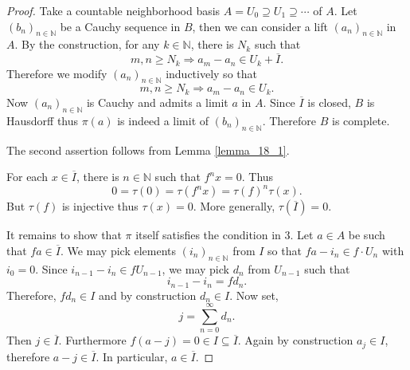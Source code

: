 \documentclass[10pt]{article}
\numberwithin{equation}{section}
\theoremstyle{definition}
\newcommand{\N}[0]{\mathbb{N}}
\begin{document}
\begin{proof}
    Take a countable neighborhood basis $A=U_0\supseteq U_1\supseteq \cdots$ of $A$. Let $(b_n)_{n\in\N}$ be a Cauchy sequence in $B$, then we can consider a lift $(a_n)_{n\in \N}$ in $A$. By the construction, for any $k\in\N$, there is $N_k$ such that
    \begin{equation*}
    m,n\geq N_k\Rightarrow a_m-a_n\in U_k + \overline{I}.
    \end{equation*}
    Therefore we modify $(a_n)_{n\in\N}$ inductively so that
    \begin{equation*}
    m,n\geq N_k\Rightarrow a_m-a_n\in U_k.
    \end{equation*}
    Now $(a_n)_{n\in\N}$ is Cauchy and admits a limit $a$ in $A$. Since $\overline{I}$ is closed, $B$ is Hausdorff thus $\pi(a)$ is indeed a limit of $(b_n)_{n\in\N}$. Therefore $B$ is complete.
    \par The second assertion follows from Lemma \ref{lemma_18_1}.
    \par For each $x\in\overline{I}$, there is $n\in\N$ such that $f^nx = 0$. Thus
    \begin{equation*}
    0 = \tau(0) = \tau(f^nx) = \tau(f)^n\tau(x).
    \end{equation*}
    But $\tau(f)$ is injective thus $\tau(x)=0$. More generally, $\tau(\overline{I})=0$.
    \par It remains to show that $\pi$ itself satisfies the condition in 3. Let $a\in A$ be such that $fa\in \overline{I}$. We may pick elements $(i_n)_{n\in\N}$ from $I$ so that $fa-i_n\in f\cdot U_n$ with $i_0 = 0$. Since $i_{n-1}-i_n\in fU_{n-1}$, we may pick $d_n$ from $U_{n-1}$ such that
    \begin{equation*}
    i_{n-1}-i_n = fd_n.
    \end{equation*}
    Therefore, $f d_n\in I$ and by construction $d_n\in I$. Now set,
    \begin{equation*}
    j = \sum_{n=0}^\infty d_n.
    \end{equation*}
    Then $j\in \overline{I}$. Furthermore $f(a-j) = 0\in I\subseteq\overline{I}$. Again by construction $a_j\in I$, therefore $a-j\in\overline{I}$. In particular, $a\in\overline{I}$.
\end{proof}
\end{document}
